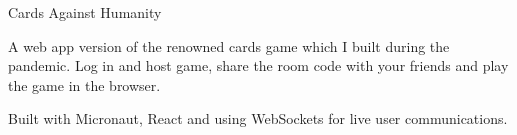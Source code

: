 \cventry
    {Cards Against Humanity} %
    {} %
    {} %
    {} %
    {\begin{cvitems}
        \item{A web app version of the renowned cards game which I built during the pandemic. Log in and host game, share the room code with your friends and play the game in the browser.}
        \item{Built with Micronaut, React and using WebSockets for live user communications.}
    \end{cvitems}}